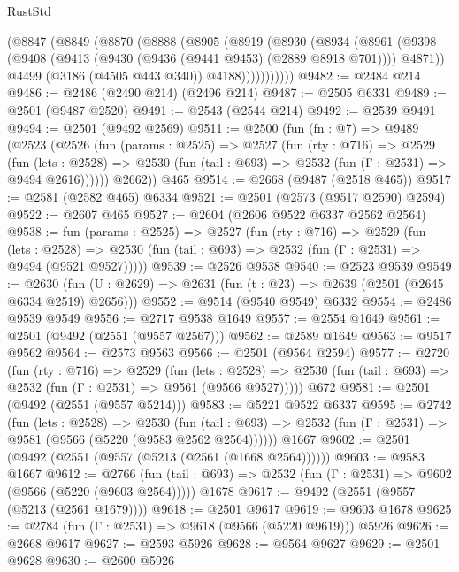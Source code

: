 \begin{lexlean}{RustStd}
\begin{coremodule}
{\begin{coremodule}
{{{{{{{{{{{{{{{{{{{{        (@8847
          (@8849
            (@8870
              (@8888
                (@8905
                  (@8919
                    (@8930
                      (@8934
                        (@8961
                          (@9398
                            (@9408 (@9413 (@9430 (@9436 (@9441 @9453) (@2889 @8918 @701)))) @4871))
                          @4499
                          (@3186 (@4505 @443 @340))
                          @4188)))))))))))
@9482 := @2484 @214
@9486 := @2486 (@2490 @214) (@2496 @214)
@9487 := @2505 @6331
@9489 := @2501 (@9487 @2520)
@9491 := @2543 (@2544 @214)
@9492 := @2539 @9491
@9494 := @2501 (@9492 @2569)
@9511 := @2500
    (fun (fn : @7) =>
    @9489
      (@2523
        (@2526
          (fun (params : @2525) =>
          @2527
            (fun (rty : @716) =>
            @2529
              (fun (lets : @2528) =>
              @2530 (fun (tail : @693) => @2532 (fun (Γ : @2531) => @9494 @2616))))))
        @2662))
    @465
@9514 := @2668 (@9487 (@2518 @465))
@9517 := @2581 (@2582 @465) @6334
@9521 := @2501 (@2573 (@9517 @2590) @2594)
@9522 := @2607 @465
@9527 := @2604 (@2606 @9522 @6337 @2562 @2564)
@9538 := fun (params : @2525) =>
  @2527
    (fun (rty : @716) =>
    @2529
      (fun (lets : @2528) =>
      @2530 (fun (tail : @693) => @2532 (fun (Γ : @2531) => @9494 (@9521 @9527)))))
@9539 := @2526 @9538
@9540 := @2523 @9539
@9549 := @2630 (fun (U : @2629) => @2631 (fun (t : @23) => @2639 (@2501 (@2645 @6334 @2519) @2656)))
@9552 := @9514 (@9540 @9549) @6332
@9554 := @2486 @9539 @9549
@9556 := @2717 @9538 @1649
@9557 := @2554 @1649
@9561 := @2501 (@9492 (@2551 (@9557 @2567)))
@9562 := @2589 @1649
@9563 := @9517 @9562
@9564 := @2573 @9563
@9566 := @2501 (@9564 @2594)
@9577 := @2720
    (fun (rty : @716) =>
    @2529
      (fun (lets : @2528) =>
      @2530 (fun (tail : @693) => @2532 (fun (Γ : @2531) => @9561 (@9566 @9527)))))
    @672
@9581 := @2501 (@9492 (@2551 (@9557 @5214)))
@9583 := @5221 @9522 @6337
@9595 := @2742
    (fun (lets : @2528) =>
    @2530
      (fun (tail : @693) => @2532 (fun (Γ : @2531) => @9581 (@9566 (@5220 (@9583 @2562 @2564))))))
    @1667
@9602 := @2501 (@9492 (@2551 (@9557 (@5213 (@2561 (@1668 @2564))))))
@9603 := @9583 @1667
@9612 := @2766
    (fun (tail : @693) => @2532 (fun (Γ : @2531) => @9602 (@9566 (@5220 (@9603 @2564)))))
    @1678
@9617 := @9492 (@2551 (@9557 (@5213 (@2561 @1679))))
@9618 := @2501 @9617
@9619 := @9603 @1678
@9625 := @2784 (fun (Γ : @2531) => @9618 (@9566 (@5220 @9619))) @5926
@9626 := @2668 @9617
@9627 := @2593 @5926
@9628 := @9564 @9627
@9629 := @2501 @9628
@9630 := @2600 @5926
}}}}}}}}}}}}}}}}}}}}
\end{coremodule}}
\end{coremodule}
\end{lexlean}
